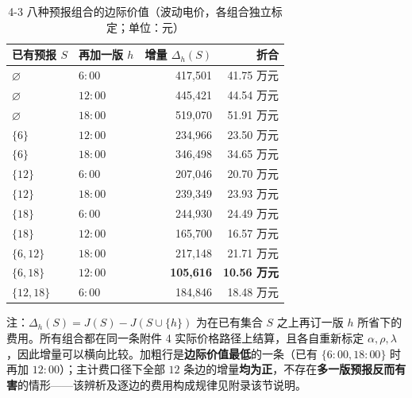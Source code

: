 
\begin{table}[htbp]
  \centering
  \caption{4-3 八种预报组合的边际价值（波动电价，各组合独立标定；单位：元）}
  \label{tab:p4-combo-detail}
  \footnotesize
  \begin{tabular}{llrr}
    \toprule
    已有预报 $S$ & 再加一版 $h$ & 增量 $\Delta_h(S)$ & 折合 \\
    \midrule
    $\varnothing$ & $6{:}00$ & 417,501 & 41.75 万元 \\
    $\varnothing$ & $12{:}00$ & 445,421 & 44.54 万元 \\
    $\varnothing$ & $18{:}00$ & 519,070 & 51.91 万元 \\
    \midrule
    $\{6\}$ & $12{:}00$ & 234,966 & 23.50 万元 \\
    $\{6\}$ & $18{:}00$ & 346,498 & 34.65 万元 \\
    $\{12\}$ & $6{:}00$ & 207,046 & 20.70 万元 \\
    $\{12\}$ & $18{:}00$ & 239,349 & 23.93 万元 \\
    $\{18\}$ & $6{:}00$ & 244,930 & 24.49 万元 \\
    $\{18\}$ & $12{:}00$ & 165,700 & 16.57 万元 \\
    \midrule
    $\{6,12\}$ & $18{:}00$ & 217,148 & 21.71 万元 \\
    $\{6,18\}$ & $12{:}00$ & \textbf{105,616} & \textbf{10.56 万元} \\
    $\{12,18\}$ & $6{:}00$ & 184,846 & 18.48 万元 \\
    \bottomrule
  \end{tabular}
  \par\vspace{2pt}
  \begin{minipage}{.92\textwidth}\footnotesize
    注：$\Delta_h(S)=J(S)-J(S\cup\{h\})$ 为在已有集合 $S$ 之上再订一版 $h$ 所省下的费用。所有组合都在同一条附件 4 实际价格路径上结算，且各自重新标定 $\alpha,\rho,\lambda$，因此增量可以横向比较。加粗行是\textbf{边际价值最低}的一条（已有 $\{6{:}00,18{:}00\}$ 时再加 $12{:}00$）；主计费口径下全部 $12$ 条边的增量\textbf{均为正}，不存在\textbf{多一版预报反而有害}的情形——该辨析及逐边的费用构成规律见附录该节说明。
  \end{minipage}
\end{table}
